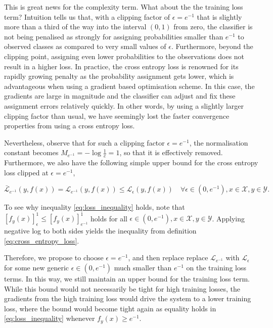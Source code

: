 \documentclass{article}
\begin{document}
		This is great news for the complexity term. What about the the training loss term? Intuition tells us that, with a clipping factor of $\epsilon = e^{-1}$ that is slightly more than a third of the way into the interval $(0, 1)$ from zero, the classifier is not being penalised as strongly for assigning probabilities smaller than $e^{-1}$ to observed classes as compared to very small values of $\epsilon$. Furthermore, beyond the clipping point, assigning even lower probabilities to the observations does not result in a higher loss. In practice, the cross entropy loss is renowned for its rapidly growing penalty as the probability assignment gets lower, which is advantageous when using a gradient based optimisation scheme. In this case, the gradients are large in magnitude and the classifier can adjust and fix these assignment errors relatively quickly. In other words, by using a slightly larger clipping factor than usual, we have seemingly lost the faster convergence properties from using a cross entropy loss.
		
		Nevertheless, observe that for such a clipping factor $\epsilon = e^{-1}$, the normalisation constant becomes $M_{e^{-1}} = - \log{\frac{1}{e}} = 1$, so that it is effectively removed. Furthermore, we also have the following simple upper bound for the cross entropy loss clipped at $\epsilon = e^{-1}$,
		
		\begin{equation}
			\bar{\mathcal{L}}_{e^{-1}}(y, f(x)) = \mathcal{L}_{e^{-1}}(y, f(x)) \leq \mathcal{L}_{\epsilon}(y, f(x)) \quad \forall \epsilon \in (0, e^{-1}), x \in \mathcal{X}, y \in \mathcal{Y}.
		\label{eq:loss_inequality}
		\end{equation}
		
		To see why inequality \eqref{eq:loss_inequality} holds, note that $[f_{y}(x)]_{\epsilon}^{1} \leq [f_{y}(x)]_{e^{-1}}^{1}$ holds for all $\epsilon \in (0, e^{-1}), x \in \mathcal{X}, y \in \mathcal{Y}$. Applying negative log to both sides yields the inequality from definition \eqref{eq:cross_entropy_loss}.

		Therefore, we propose to choose $\epsilon = e^{-1}$, and then replace replace $\mathcal{L}_{e^{-1}}$ with $\mathcal{L}_{\epsilon}$ for some new generic $\epsilon \in (0, e^{-1})$ much smaller than $e^{-1}$ on the training loss terms. In this way, we still maintain an upper bound for the training loss term. While this bound would not necessarily be tight for high training losses, the gradients from the high training loss would drive the system to a lower training loss, where the bound would become tight again as equality holds in \eqref{eq:loss_inequality} whenever $f_{y}(x) \geq e^{-1}$.
		
\end{document}
